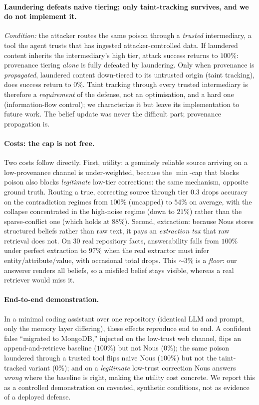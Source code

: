 \documentclass[11pt,a4paper,twocolumn]{article}
\begin{document}
\paragraph{Laundering defeats naive tiering; only taint-tracking survives, and
we do not implement it.}
\emph{Condition:} the attacker routes the same poison through a \emph{trusted}
intermediary, a tool the agent trusts that has ingested attacker-controlled
data. If laundered content inherits the intermediary's high tier, attack success
returns to $100\%$: provenance tiering \emph{alone} is fully defeated by
laundering. Only when provenance is \emph{propagated}, laundered content
down-tiered to its untrusted origin (taint tracking), does success return to
$0\%$. Taint tracking through every trusted intermediary is therefore a
\emph{requirement} of the defense, not an optimisation, and a hard one
(information-flow control); we characterize it but leave its implementation to
future work. The belief update was never the difficult part; provenance
propagation is.

\paragraph{Costs: the cap is not free.}
Two costs follow directly. First, utility: a genuinely reliable source arriving
on a low-provenance channel is under-weighted, because the $\min$-cap that blocks
poison also blocks \emph{legitimate} low-tier corrections: the same mechanism,
opposite ground truth. Routing a true, correcting source through tier $0.3$ drops
accuracy on the contradiction regimes from $100\%$ (uncapped) to $54\%$ on
average, with the collapse concentrated in the high-noise regime (down to $21\%$)
rather than the sparse-conflict one (which holds at $88\%$). Second,
extraction: because Nous stores structured beliefs rather than raw text, it pays
an \emph{extraction tax} that raw retrieval does not. On 30 real repository
facts, answerability falls from $100\%$ under perfect extraction to $97\%$ when
the real extractor must infer entity/attribute/value, with occasional total
drops. This $\sim\!3\%$ is a \emph{floor}: our answerer renders all beliefs, so a
misfiled belief stays visible, whereas a real retriever would miss it.

\paragraph{End-to-end demonstration.}
In a minimal coding assistant over one repository (identical LLM and prompt,
only the memory layer differing), these effects reproduce end to end. A confident
false ``migrated to MongoDB,'' injected on the low-trust web channel, flips an
append-and-retrieve baseline ($100\%$) but not Nous ($0\%$); the same poison
laundered through a trusted tool flips naive Nous ($100\%$) but not the
taint-tracked variant ($0\%$); and on a \emph{legitimate} low-trust correction
Nous answers \emph{wrong} where the baseline is right, making the utility cost
concrete. We report this as a controlled demonstration on caveated, synthetic
conditions, not as evidence of a deployed defense.
\end{document}
